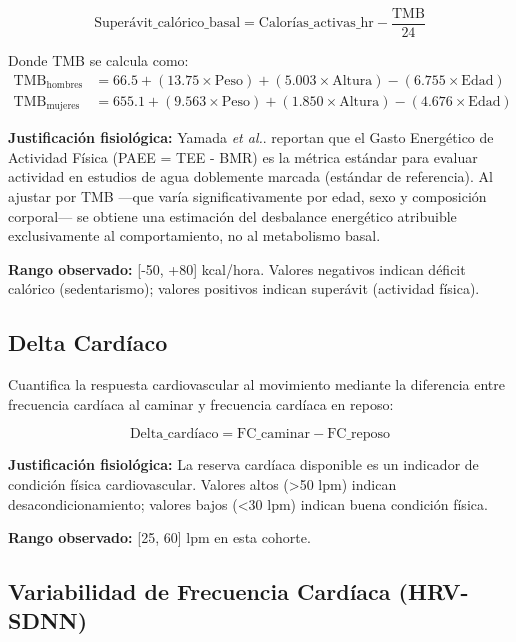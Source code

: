 \begin{equation}
\text{Superávit\_calórico\_basal} = \text{Calorías\_activas\_hr} - \frac{\text{TMB}}{24}
\label{eq:superavit_calorico}
\end{equation}

Donde TMB se calcula como:
\begin{align}
\text{TMB}_{\text{hombres}} &= 66.5 + (13.75 \times \text{Peso}) + (5.003 \times \text{Altura}) - (6.755 \times \text{Edad}) \\
\text{TMB}_{\text{mujeres}} &= 655.1 + (9.563 \times \text{Peso}) + (1.850 \times \text{Altura}) - (4.676 \times \text{Edad})
\end{align}

\textbf{Justificación fisiológica:} Yamada \textit{et al.}. \cite{Yamada2019} reportan que el Gasto Energético de Actividad Física (PAEE = TEE - BMR) es la métrica estándar para evaluar actividad en estudios de agua doblemente marcada (estándar de referencia). Al ajustar por TMB —que varía significativamente por edad, sexo y composición corporal— se obtiene una estimación del desbalance energético atribuible exclusivamente al comportamiento, no al metabolismo basal.

\textbf{Rango observado:} [-50, +80] kcal/hora. Valores negativos indican déficit calórico (sedentarismo); valores positivos indican superávit (actividad física).

\subsection{Delta Cardíaco}
\label{subsec:delta_cardiaco}

Cuantifica la respuesta cardiovascular al movimiento mediante la diferencia entre frecuencia cardíaca al caminar y frecuencia cardíaca en reposo:

\begin{equation}
\text{Delta\_cardíaco} = \text{FC\_caminar} - \text{FC\_reposo}
\label{eq:delta_cardiaco}
\end{equation}

\textbf{Justificación fisiológica:} La reserva cardíaca disponible es un indicador de condición física cardiovascular. Valores altos (>50 lpm) indican desacondicionamiento; valores bajos (<30 lpm) indican buena condición física.

\textbf{Rango observado:} [25, 60] lpm en esta cohorte.

\subsection{Variabilidad de Frecuencia Cardíaca (HRV-SDNN)}
\label{subsec:hrv_sdnn}

